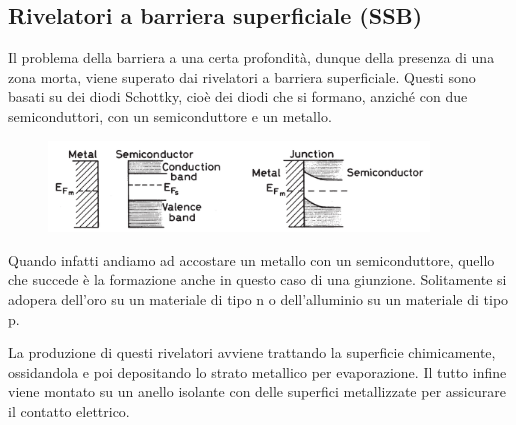 \subsection{Rivelatori a barriera superficiale (SSB)}
Il problema della barriera a una certa profondità, dunque della presenza di una zona morta, viene superato dai rivelatori a barriera superficiale. Questi sono basati su dei diodi Schottky, cioè dei diodi che si formano, anziché con due semiconduttori, con un semiconduttore e un metallo.
\begin{figure}[H]
   \centering
   \includegraphics[width=0.9\textwidth]{immagini/rivelatori_a_barriera_superficiale.png}
\end{figure}
Quando infatti andiamo ad accostare un metallo con un semiconduttore, quello che succede è la formazione anche in questo caso di una giunzione. Solitamente si adopera dell'oro su un materiale di tipo n o dell'alluminio su un materiale di tipo p.

La produzione di questi rivelatori avviene trattando la superficie chimicamente, ossidandola e poi depositando lo strato metallico per evaporazione. Il tutto infine viene montato su un anello isolante con delle superfici metallizzate per assicurare il contatto elettrico.

